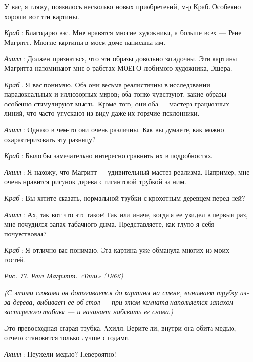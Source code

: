 \documentclass[../main.tex]{subfiles}
\begin{document}


\begin{dialogue}

 У вас, я гляжу, появилось несколько новых приобретений, м-р Краб. Особенно хороши вот эти картины.

\emph{Краб} : Благодарю вас. Мне нравятся многие художники, а больше всех --- Рене Магритт. Многие картины в моем доме написаны им.

\emph{Ахилл} : Должен признаться, что эти образы довольно загадочны. Эти картины Магритта напоминают мне о работах МОЕГО любимого художника, Эшера.

\emph{Краб} : Я вас понимаю. Оба они весьма реалистичны в исследовании парадоксальных и иллюзорных миров; оба тонко чувствуют, какие образы особенно стимулируют мысль. Кроме того, они оба --- мастера грациозных линий, что часто упускают из виду даже их горячие поклонники.

\emph{Ахилл} : Однако в чем-то они очень различны. Как вы думаете, как можно охарактеризовать эту разницу?

\emph{Краб} : Было бы замечательно интересно сравнить их в подробностях.

\emph{Ахилл} : Я нахожу, что Магритт --- удивительный мастер реализма. Например, мне очень нравится рисунок дерева с гигантской трубкой за ним.

\emph{Краб} : Вы хотите сказать, нормальной трубки с крохотным деревцем перед ней?

\emph{Ахилл} : Ах, так вот что это такое! Так или иначе, когда я ее увидел в первый раз, мне почудился запах табачного дыма. Представляете, как глупо я себя почувствовал?

\emph{Краб} : Я отлично вас понимаю. Эта картина уже обманула многих из моих гостей.

\emph{Рис. 77. Рене Магритт. «Тени» (1966)}

\emph{(С этими словами он дотягивается до картины на стене, вынимает трубку из-за дерева, выбивает ее об стол --- при этом комната наполняется запахом застарелого табака --- и начинает набивать ее снова.)}

Это превосходная старая трубка, Ахилл. Верите ли, внутри она обита медью, отчего становится только лучше с годами.

\emph{Ахилл} : Неужели медью? Невероятно!


\end{dialogue}
\end{document}
